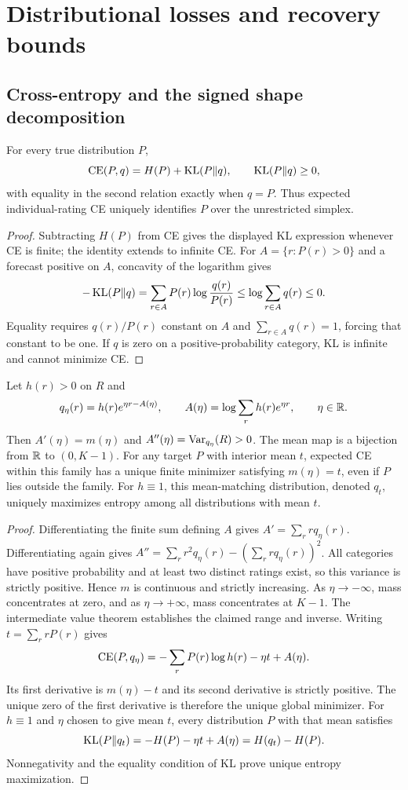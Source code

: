 \section{Distributional losses and recovery bounds}
\subsection{Cross-entropy and the signed shape decomposition}
\begin{proposition}\label{prop:ce}
For every true distribution $P$,
\[
 \operatorname{CE}(P,q)=H(P)+\operatorname{KL}(P\Vert q),\qquad \operatorname{KL}(P\Vert q)\ge0,
\]
with equality in the second relation exactly when $q=P$.
Thus expected individual-rating CE uniquely identifies $P$ over the unrestricted simplex.
\end{proposition}
\begin{proof}
Subtracting $H(P)$ from CE gives the displayed KL expression whenever CE is finite; the identity extends to infinite CE.
For $A=\{r:P(r)>0\}$ and a forecast positive on $A$, concavity of the logarithm gives
\[
 -\operatorname{KL}(P\Vert q)=\sum_{r\in A}P(r)\log\frac{q(r)}{P(r)}
 \le\log\sum_{r\in A}q(r)\le0.
\]
Equality requires $q(r)/P(r)$ constant on $A$ and $\sum_{r\in A}q(r)=1$, forcing that constant to be one.
If $q$ is zero on a positive-probability category, KL is infinite and cannot minimize CE.
\end{proof}

\begin{proposition}\label{prop:exponential}
Let $h(r)>0$ on $R$ and
\[
 q_\eta(r)=h(r)e^{\eta r-A(\eta)},\qquad
 A(\eta)=\log\sum_r h(r)e^{\eta r},\qquad \eta\in\mathbb{R}.
\]
Then $A'(\eta)=m(\eta)$ and $A''(\eta)=\operatorname{Var}_{q_\eta}(R)>0$.
The mean map is a bijection from $\mathbb{R}$ to $(0,K-1)$.
For any target $P$ with interior mean $t$, expected CE within this family has a unique finite minimizer satisfying $m(\eta)=t$, even if $P$ lies outside the family.
For $h\equiv1$, this mean-matching distribution, denoted $q_t$, uniquely maximizes entropy among all distributions with mean $t$.
\end{proposition}
\begin{proof}
Differentiating the finite sum defining $A$ gives $A'=\sum_r r q_\eta(r)$.
Differentiating again gives $A''=\sum_r r^2q_\eta(r)-(\sum_r rq_\eta(r))^2$.
All categories have positive probability and at least two distinct ratings exist, so this variance is strictly positive.
Hence $m$ is continuous and strictly increasing.
As $\eta\to-\infty$, mass concentrates at zero, and as $\eta\to+\infty$, mass concentrates at $K-1$.
The intermediate value theorem establishes the claimed range and inverse.
Writing $t=\sum_r rP(r)$ gives
\[
 \operatorname{CE}(P,q_\eta)=-\sum_rP(r)\log h(r)-\eta t+A(\eta).
\]
Its first derivative is $m(\eta)-t$ and its second derivative is strictly positive.
The unique zero of the first derivative is therefore the unique global minimizer.
For $h\equiv1$ and $\eta$ chosen to give mean $t$, every distribution $P$ with that mean satisfies
\[
 \operatorname{KL}(P\Vert q_t)=-H(P)-\eta t+A(\eta)=H(q_t)-H(P).
\]
Nonnegativity and the equality condition of KL prove unique entropy maximization.
\end{proof}

